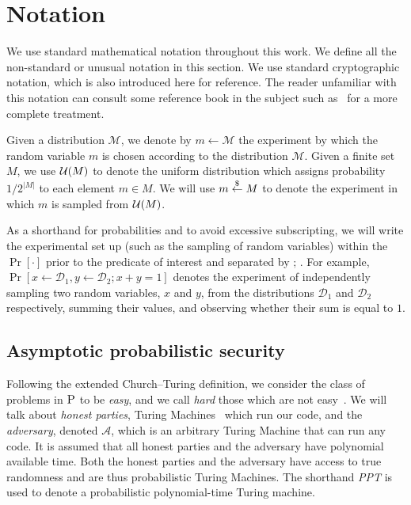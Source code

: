 \section{Notation}
We use standard mathematical notation throughout this work. We define all the
non-standard or unusual notation in this section. We use standard cryptographic
notation, which is also introduced here for reference. The reader unfamiliar
with this notation can consult some reference book in the subject such
as~\cite{katz} for a more complete treatment.


Given a distribution $\mathcal{M}$, we denote by $m \gets \mathcal{M}$ the experiment by which the random variable $m$ is chosen according to the distribution $\mathcal{M}$. Given a finite set $M$, we use $\mathcal{U}(M)$ to denote the uniform distribution which assigns probability $1 / 2^{|M|}$ to each element $m \in M$. We will use $m \overset{\$}{\gets} M$ to denote the experiment in which $m$ is sampled from $\mathcal{U}(M)$.

As a shorthand for probabilities and to avoid excessive subscripting, we will write the experimental set up (such as the sampling of random variables) within the $\Pr[\cdot]$ prior to the predicate of interest and separated by $;\,$. For example, $\Pr[x \gets \mathcal{D}_1, y \gets \mathcal{D}_2; x + y = 1]$ denotes the experiment of independently sampling two random variables, $x$ and $y$, from the distributions $\mathcal{D}_1$ and $\mathcal{D}_2$ respectively, summing their values, and observing whether their sum is equal to $1$.

\subsection{Asymptotic probabilistic security}

Following the extended Church--Turing definition, we consider the class of
problems in $\textsc{P}$ to be \emph{easy}, and we call \emph{hard} those which
are not easy~\cite{sipser}. We will talk about \emph{honest parties}, Turing
Machines~\cite{turing} which run our code, and the \emph{adversary}, denoted $\mathcal{A}$, which is an arbitrary
Turing Machine that can run any code. It is assumed that all honest parties and the adversary have polynomial available time. Both the honest parties and the adversary have access to true randomness and are thus probabilistic Turing Machines.
The shorthand \emph{PPT} is used to denote a probabilistic polynomial-time
Turing machine.


